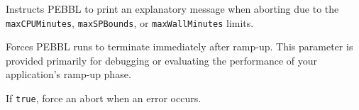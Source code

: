 Instructs PEBBL to print an explanatory message when
aborting due to the \texttt{maxCPUMinutes}, \texttt{maxSPBounds}, or
\texttt{maxWallMinutes} limits.

Forces PEBBL runs to terminate immediately after ramp-up.  This
parameter is provided primarily for debugging or evaluating the
performance of your application's ramp-up phase.

If \texttt{true}, force an abort when an error occurs.


